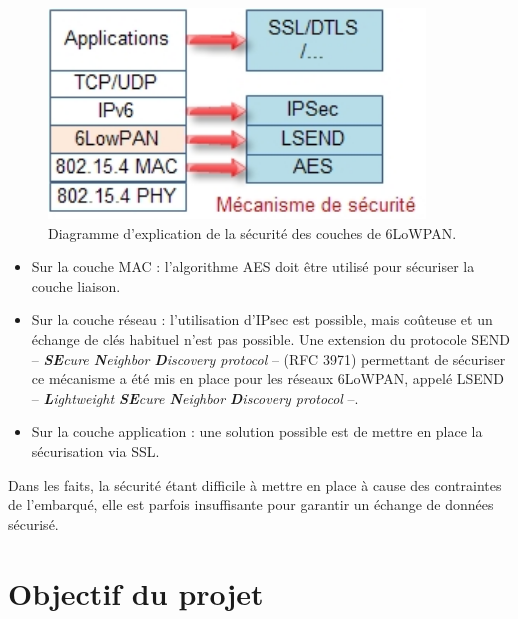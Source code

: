 		\begin{figure}[htp]
			\centering
			\includegraphics[width=10cm]{images/6lowpan-secu.jpg}
			\caption{Diagramme d'explication de la sécurité des couches de 6LoWPAN.}
			\label{fig:diagramme-6lowpan-secu}
		\end{figure}
		
		\begin{itemize}
			\item Sur la couche MAC : l'algorithme AES doit être utilisé pour sécuriser la couche liaison.
			\item Sur la couche réseau : l'utilisation d'IPsec est possible, mais coûteuse et un échange de clés habituel n'est pas possible. Une extension du protocole SEND -- \emph{\textbf{SE}cure \textbf{N}eighbor \textbf{D}iscovery protocol} -- (RFC 3971) permettant de sécuriser ce mécanisme a été mis en place pour les réseaux 6LoWPAN, appelé LSEND -- \emph{\textbf{L}ightweight \textbf{SE}cure \textbf{N}eighbor \textbf{D}iscovery protocol} --.
			\item Sur la couche application : une solution possible est de mettre en place la sécurisation via SSL.
		\end{itemize}
		
		Dans les faits, la sécurité étant difficile à mettre en place à cause des contraintes de l'embarqué, elle est parfois insuffisante pour garantir un échange de données sécurisé.



\section{Objectif du projet}

